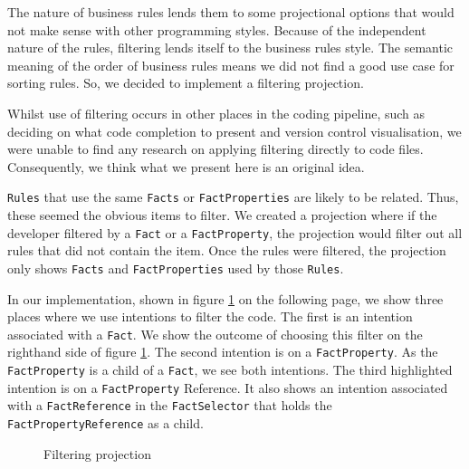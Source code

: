 The nature of business rules lends them to some projectional options that would not make sense with other programming styles.
Because of the independent nature of the rules, filtering lends itself to the business rules style.
The semantic meaning of the order of business rules means we did not find a good use case for sorting rules.
So, we decided to implement a filtering projection.

Whilst use of filtering occurs in other places in the coding pipeline, such as deciding on what code completion to present\cite{hou2010towards} and version control visualisation\cite{yoon2013visualization}, we were unable to find any research on applying filtering directly to code files.
Consequently, we think what we present here is an original idea.

\texttt{Rules} that use the same \texttt{Facts} or \texttt{FactProperties} are likely to be related.
Thus, these seemed the obvious items to filter.
We created a projection where if the developer filtered by a \texttt{Fact} or a \texttt{FactProperty}, the projection would filter out all rules that did not contain the item.
Once the rules were filtered, the projection only shows \texttt{Facts} and \texttt{FactProperties} used by those \texttt{Rules}.

In our implementation, shown in figure \ref{fig:filteringProjection} on the following page, we show three places where we use intentions to filter the code.
The first is an intention associated with a \texttt{Fact}.
We show the outcome of choosing this filter on the righthand side of figure \ref{fig:filteringProjection}.
The second intention is on a \texttt{FactProperty}.
As the \texttt{FactProperty} is a child of a \texttt{Fact}, we see both intentions.
The third highlighted intention is on a \texttt{FactProperty} Reference.
It also shows an intention associated with a \texttt{FactReference} in the \texttt{FactSelector} that holds the \texttt{FactPropertyReference} as a child.

\begin{figure}
    \centering
    \caption{Filtering projection}
    \label{fig:filteringProjection}
\end{figure}


